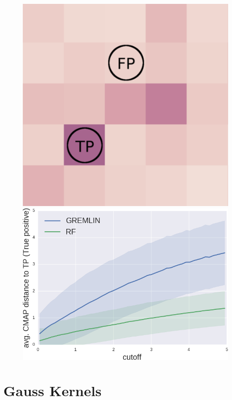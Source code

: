 \documentclass[landscape]{sciposter}
\newlength{\customfigheight}
\begin{document}
\begin{multicols}{3}
\begin{figure}
    \center 
    \hfill%
    \includegraphics[height=\customfigheight]{figures/local_structure_distance.png}%
    \hfill%
    \includegraphics[height=\customfigheight]{figures/FP_distance.png}%
    \hfill%
    \hspace{0em}
\end{figure}

\columnbreak

\section*{Gauss Kernels}


\end{multicols}
\end{document}
